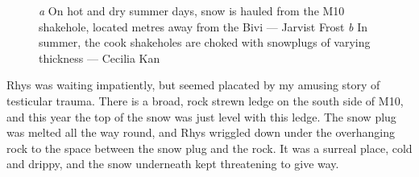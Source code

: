 \begin{figure}[b!]
	\checkoddpage \ifoddpage \forcerectofloat \else \forceversofloat \fi
	\centering
	\begin{subfigure}{0.625\textwidth}
	\centering
		\caption{}
		\label{M102015}
	\end{subfigure}
	\hfill
	\begin{subfigure}{0.355\textwidth}
		\centering
		\caption{}\label{Kan2015}
	\end{subfigure}
	\caption{\emph{a}  On hot and dry summer days, snow is hauled from the M10 shakehole, located metres away from the Bivi --- Jarvist Frost \emph{b}  In summer, the cook shakeholes are choked with snowplugs of varying thickness --- Cecilia Kan}
\end{figure}

Rhys was waiting impatiently, but seemed placated by my amusing story of testicular trauma. There is a broad, rock strewn ledge on the south side of M10, and this year the top of the snow was just level with this ledge. The snow plug was melted all the way round, and Rhys wriggled down under the overhanging rock to the space between the snow plug and the rock. It was a surreal place, cold and drippy, and the snow underneath kept threatening to give way.

